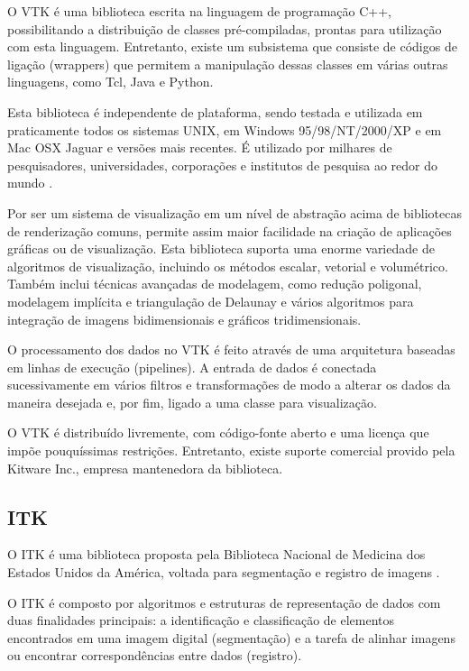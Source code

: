 O VTK é uma biblioteca escrita na linguagem de programação C++, possibilitando a distribuição de classes pré-compiladas, prontas para utilização com esta linguagem. Entretanto, existe um subsistema que consiste de códigos de ligação (wrappers) que permitem a manipulação dessas classes em várias outras linguagens, como Tcl, Java e Python.

Esta biblioteca é independente de plataforma, sendo testada e utilizada em praticamente todos os sistemas UNIX, em Windows 95/98/NT/2000/XP e em Mac OSX Jaguar e versões mais recentes. É utilizado por milhares de pesquisadores, universidades, corporações e institutos de pesquisa ao redor do mundo \cite{vtk-page}.

Por ser um sistema de visualização em um nível de abstração acima de bibliotecas de renderização comuns, permite assim maior facilidade na criação de aplicações gráficas ou de visualização. Esta biblioteca suporta uma enorme variedade de algoritmos de visualização, incluindo os métodos escalar, vetorial e volumétrico. Também inclui técnicas avançadas de modelagem, como redução poligonal, modelagem implícita e triangulação de Delaunay e vários algoritmos para integração de imagens bidimensionais e gráficos tridimensionais.

O processamento dos dados no VTK é feito através de uma arquitetura baseadas em linhas de execução (pipelines). A entrada de dados é conectada sucessivamente em vários filtros e transformações de modo a alterar os dados da maneira desejada e, por fim, ligado a uma classe para visualização.

O VTK é distribuído livremente, com código-fonte aberto e uma licença que impõe pouquíssimas restrições. Entretanto, existe suporte comercial provido pela Kitware Inc., empresa mantenedora da biblioteca.

\subsection{ITK}

O ITK é uma biblioteca proposta pela Biblioteca Nacional de Medicina dos Estados Unidos da América, voltada para segmentação e registro de imagens \cite{yoo}.

O ITK é composto por algoritmos e estruturas de representação de dados com duas finalidades principais: a identificação e classificação de elementos encontrados em uma imagem digital (segmentação) e a tarefa de alinhar imagens ou encontrar correspondências entre dados (registro).

